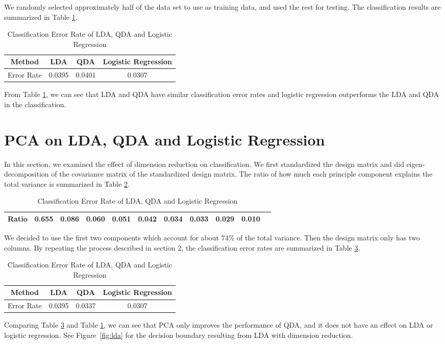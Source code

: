 \documentclass[12pt]{article}
\begin{document}
We randomly selected approximately half of the data set to use as training data, and used the rest for testing. The classification results are summarized in Table \ref{tab1}.


\begin{table}[htbp]
\begin{center}
\caption{\label{tab1} Classification Error Rate of LDA, QDA and Logistic Regression}
\begin{tabular}{c|ccc}
				\hline
Method&LDA &QDA &Logistic Regression \\
				\hline
Error Rate &0.0395 &0.0401 &0.0307  \\
				\hline
\end{tabular}
\end{center}
\end{table}
From Table \ref{tab1}, we can see that LDA and QDA have similar classification error rates and logistic regression outperforms the LDA and QDA in the classification.


\section{PCA on LDA, QDA and Logistic Regression}
In this section, we examined the effect of dimension reduction on classification. We first standardized the design matrix and did eigen-decomposition of the covariance matrix of the standardized design matrix. The ratio of how much each principle component explains the total variance is summarized in Table \ref{tab2}.
\begin{table}[htbp]
	\begin{center}
	
		\caption{\label{tab2} Classification Error Rate of LDA, QDA and Logistic Regression}
		\begin{tabular}{c|cccccccccc}
			\hline
Ratio &0.655& 0.086& 0.060& 0.051& 0.042& 0.034& 0.033& 0.029& 0.010 \\
			\hline
	\end{tabular}
	\end{center}
\end{table}
We decided to use the first two components which account for about $74$\% of the total variance. Then the design matrix only has two columns. By repeating the process described in section 2, the classification error rates are summarized in Table \ref{tab3}.
\begin{table}[htbp]
	\begin{center}
		\caption{\label{tab3} Classification Error Rate of LDA, QDA and Logistic Regression}
		\begin{tabular}{c|ccc}
			\hline
			Method&LDA &QDA &Logistic Regression \\
			\hline
			Error Rate &0.0395 &0.0337 &0.0307  \\
			\hline
		\end{tabular}
	\end{center}
\end{table}
Comparing Table \ref{tab3} and Table \ref{tab1}, we can see that PCA only improves the performance of QDA, and it does not have an effect on LDA or logistic regression. See Figure~\ref{fig:lda} for the decision boundary resulting from LDA with dimension reduction.
\end{document}
